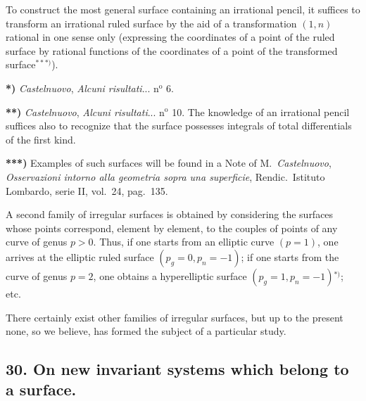 \documentclass{article}
\begin{document}
To construct the most general surface containing an irrational pencil, it suffices to transform an irrational ruled surface by the aid of a transformation $(1, n)$ rational in one sense only (expressing the coordinates of a point of the ruled surface by rational functions of the coordinates of a point of the transformed surface${}^{***)}$).

\textbf{*)} \emph{Castelnuovo}, \emph{Alcuni risultati}... n${}^{\text{o}}$ 6.

\textbf{**)} \emph{Castelnuovo}, \emph{Alcuni risultati}... n${}^{\text{o}}$ 10. The knowledge of an irrational pencil suffices also to recognize that the surface possesses integrals of total differentials of the first kind.

\textbf{***)} Examples of such surfaces will be found in a Note of M.\ \emph{Castelnuovo}, \emph{Osservazioni intorno alla geometria sopra una superficie}, Rendic.\ Istituto Lombardo, serie II, vol.\ 24, pag.\ 135.


A second family of irregular surfaces is obtained by considering the surfaces whose points correspond, element by element, to the couples of points of any curve of genus $p > 0$. Thus, if one starts from an elliptic curve $(p = 1)$, one arrives at the elliptic ruled surface $(p_{g} = 0, p_{n} = -1)$; if one starts from the curve of genus $p = 2$, one obtains a hyperelliptic surface $(p_{g} = 1, p_{n} = -1)$${}^{*)}$; etc.

There certainly exist other families of irregular surfaces, but up to the present none, so we believe, has formed the subject of a particular study.

\subsection*{30. On new invariant systems which belong to a surface.}
\end{document}
